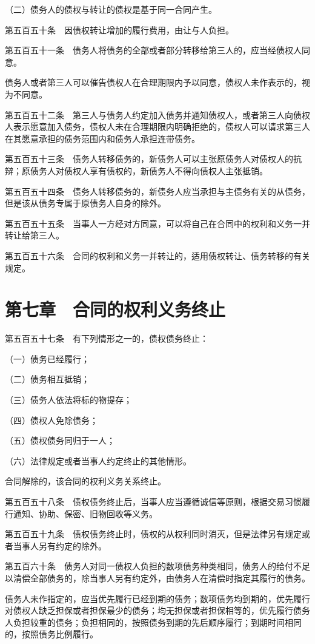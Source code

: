 \documentclass[UTF8,12pt,a4paper]{ctexbook}
\begin{document}
（二）债务人的债权与转让的债权是基于同一合同产生。

第五百五十条　因债权转让增加的履行费用，由让与人负担。

第五百五十一条　债务人将债务的全部或者部分转移给第三人的，应当经债权人同意。

债务人或者第三人可以催告债权人在合理期限内予以同意，债权人未作表示的，视为不同意。

第五百五十二条　第三人与债务人约定加入债务并通知债权人，或者第三人向债权人表示愿意加入债务，债权人未在合理期限内明确拒绝的，债权人可以请求第三人在其愿意承担的债务范围内和债务人承担连带债务。

第五百五十三条　债务人转移债务的，新债务人可以主张原债务人对债权人的抗辩；原债务人对债权人享有债权的，新债务人不得向债权人主张抵销。

第五百五十四条　债务人转移债务的，新债务人应当承担与主债务有关的从债务，但是该从债务专属于原债务人自身的除外。

第五百五十五条　当事人一方经对方同意，可以将自己在合同中的权利和义务一并转让给第三人。

第五百五十六条　合同的权利和义务一并转让的，适用债权转让、债务转移的有关规定。

\section*{第七章　合同的权利义务终止}

第五百五十七条　有下列情形之一的，债权债务终止：

（一）债务已经履行；

（二）债务相互抵销；

（三）债务人依法将标的物提存；

（四）债权人免除债务；

（五）债权债务同归于一人；

（六）法律规定或者当事人约定终止的其他情形。

合同解除的，该合同的权利义务关系终止。

第五百五十八条　债权债务终止后，当事人应当遵循诚信等原则，根据交易习惯履行通知、协助、保密、旧物回收等义务。

第五百五十九条　债权债务终止时，债权的从权利同时消灭，但是法律另有规定或者当事人另有约定的除外。

第五百六十条　债务人对同一债权人负担的数项债务种类相同，债务人的给付不足以清偿全部债务的，除当事人另有约定外，由债务人在清偿时指定其履行的债务。

债务人未作指定的，应当优先履行已经到期的债务；数项债务均到期的，优先履行对债权人缺乏担保或者担保最少的债务；均无担保或者担保相等的，优先履行债务人负担较重的债务；负担相同的，按照债务到期的先后顺序履行；到期时间相同的，按照债务比例履行。
\end{document}

